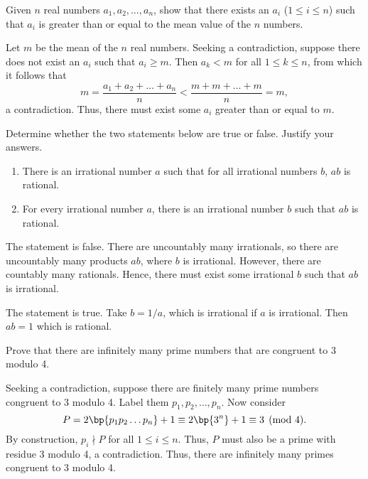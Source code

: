 \begin{problem}
    Given $n$ real numbers $a_1, a_2, \dots, a_n$, show that there exists an $a_i$ ($1 \leq i \leq n$) such that $a_i$ is greater than or equal to the mean value of the $n$ numbers.
\end{problem}
\begin{solution}
    Let $m$ be the mean of the $n$ real numbers. Seeking a contradiction, suppose there does not exist an $a_i$ such that $a_i \geq m$. Then $a_k < m$ for all $1 \leq k \leq n$, from which it follows that \[m = \frac{a_1 + a_2 + \dots + a_n}{n} < \frac{m + m + \dots + m}{n} = m,\] a contradiction. Thus, there must exist some $a_i$ greater than or equal to $m$.
\end{solution}

\begin{problem}
    Determine whether the two statements below are true or false. Justify your answers.

    \begin{enumerate}
        \item There is an irrational number $a$ such that for all irrational numbers $b$, $ab$ is rational.
        \item For every irrational number $a$, there is an irrational number $b$ such that $ab$ is rational.
    \end{enumerate}
\end{problem}
\begin{solution}
    \begin{ppart}
        The statement is false. There are uncountably many irrationals, so there are uncountably many products $ab$, where $b$ is irrational. However, there are countably many rationals. Hence, there must exist some irrational $b$ such that $ab$ is irrational.
    \end{ppart}
    \begin{ppart}
        The statement is true. Take $b = 1/a$, which is irrational if $a$ is irrational. Then $ab = 1$ which is rational.
    \end{ppart}
\end{solution}

\begin{problem}
    Prove that there are infinitely many prime numbers that are congruent to 3 modulo 4.
\end{problem}
\begin{solution}
    Seeking a contradiction, suppose there are finitely many prime numbers congruent to 3 modulo 4. Label them $p_1, p_2, \dots, p_n$. Now consider \[P = 2\bp{p_1p_2\dots p_n} + 1 \equiv 2\bp{3^n} + 1 \equiv 3 \pmod{4}.\] By construction, $p_i \nmid P$ for all $1 \leq i \leq n$. Thus, $P$ must also be a prime with residue 3 modulo 4, a contradiction. Thus, there are infinitely many primes congruent to 3 modulo 4.
\end{solution}

